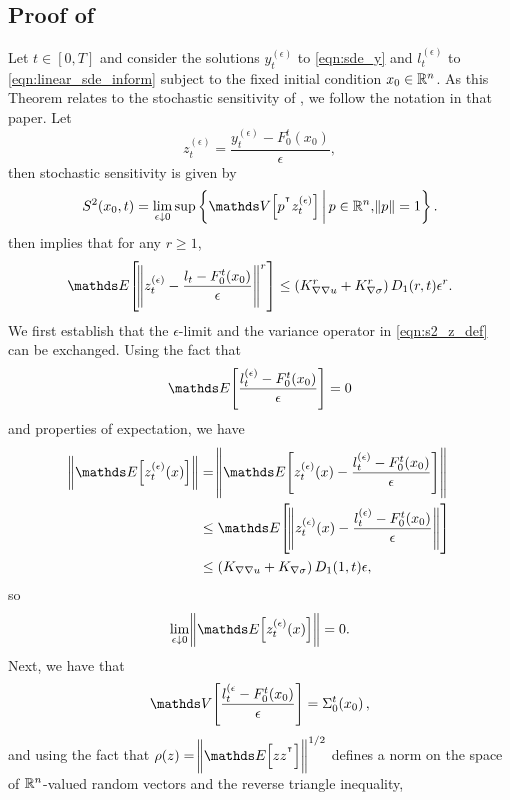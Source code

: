 \subsection{Proof of }\label{app:s2_calculation_proof}
Let \(t \in [0,T]\) and consider the solutions \(y_t^{(\epsilon)}\) to \eqref{eqn:sde_y} and \(l_t^{(\epsilon)}\) to \eqref{eqn:linear_sde_inform} subject to the fixed initial condition \(x_0 \in \mathbb{R}^n\).
As this Theorem relates to the stochastic sensitivity of \cite{Balasuriya_2020_StochasticSensitivityComputable}, we follow the notation in that paper. Let
\[
	z_t^{(\epsilon)} = \frac{y_t^{(\epsilon)} - F_0^t\!\left(x_0\right)}{\epsilon},
\]
then stochastic sensitivity is given by
\begin{equation}
	S^2\!\left(x_0, t\right) = \lim_{\epsilon\downarrow 0}\sup\setc{\var{p^{\T} z_t^{(\epsilon)}}}{p \in \R^n, \norm{p} = 1}.
	\label{eqn:s2_z_def}
\end{equation}
 then implies that for any \(r \geq 1\),
\begin{equation}
	\avg{\norm{z_t^{(\epsilon)} - \frac{l_t - F_0^t\!\left(x_0\right)}{\epsilon}}^r} \leq \left(K_{\nabla\nabla u}^r + K_{\nabla\sigma}^r\right) D_1(r,t)\epsilon^r.
	\label{eqn:main_ineq_z}
\end{equation}
We first establish that the \(\epsilon\)-limit and the variance operator in \eqref{eqn:s2_z_def} can be exchanged.
Using the fact that
\[
	\avg{\frac{l_t^{(\epsilon)} - F_0^t\!\left(x_0\right)}{\epsilon}} = 0
\]
and properties of expectation, we have
\begin{align*}
	\norm{\avg{z_t^{(\epsilon)}(x)}} & = \norm{\avg{z_t^{(\epsilon)}(x) - \frac{l_t^{(\epsilon)} - F_0^t\!\left(x_0\right)}{\epsilon}}}    \\
	                                 & \leq \avg{\norm{z_t^{(\epsilon)}(x) - \frac{l_t^{(\epsilon)} - F_0^t\!\left(x_0\right)}{\epsilon}}} \\
	                                 & \leq \left(K_{\nabla\nabla u} + K_{\nabla\sigma}\right) D_1(1, t)\epsilon,
\end{align*}
so
\[
	\lim_{\epsilon\downarrow 0}\norm{\avg{z_t^{(\epsilon)}(x)}} = 0.
\]
Next, we have that
\[
	\var{\frac{l_t^{(\epsilon} - F_0^t\!\left(x_0\right)}{\epsilon}} = \Sigma_0^t\!\left(x_0\right),
\]
and using the fact that \(\rho(z) = \norm{\avg{zz^{\T}}}^{1/2}\) defines a norm on the space of \(\mathbb{R}^n\)-valued random vectors and the reverse triangle inequality,

